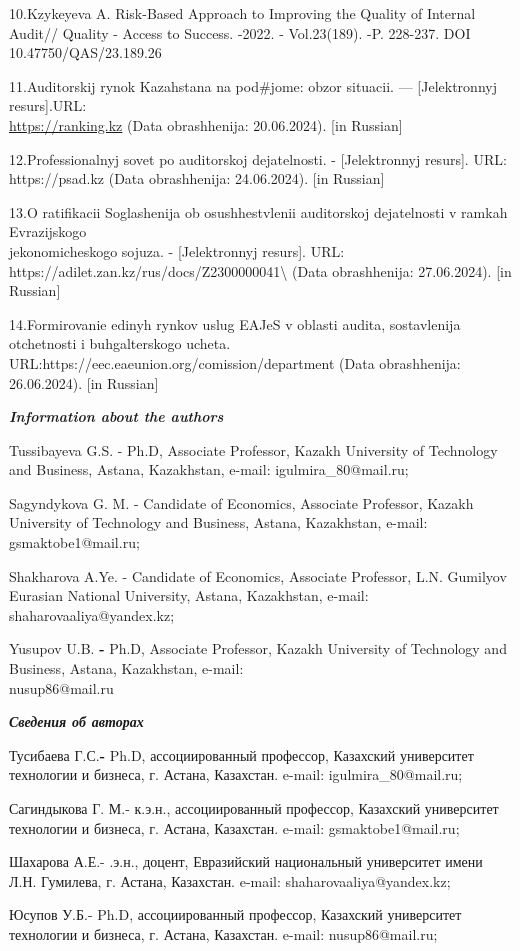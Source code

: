 \begin{references}
10.Kzykeyeva A. Risk-Based Approach to Improving the Quality of Internal
Audit// Quality - Access to Success. -2022. - Vol.23(189). -P. 228-237.
DOI 10.47750/QAS/23.189.26

11.Auditorskij rynok Kazahstana na pod\#jome: obzor situacii. ---
{[}Jelektronnyj resurs{]}.URL:
\\\href{https://ranking.kz/reviews/banking-and-finance/auditorskiy-rynok-kazahstana-na-podyome-obzor-situatsii.html}{https://ranking.kz}
(Data obrashhenija: 20.06.2024). {[}in Russian{]}

12.Professional\textquotesingle nyj sovet po auditorskoj
dejatel\textquotesingle nosti. - {[}Jelektronnyj resurs{]}. URL:
https://psad.kz (Data obrashhenija: 24.06.2024). {[}in Russian{]}

13.O ratifikacii Soglashenija ob osushhestvlenii auditorskoj
dejatel\textquotesingle nosti v ramkah Evrazijskogo \\jekonomicheskogo
sojuza. - {[}Jelektronnyj resurs{]}. URL:
https://adilet.zan.kz/rus/docs/Z2300000041\textbackslash{} (Data
obrashhenija: 27.06.2024). {[}in Russian{]}

14.Formirovanie edinyh rynkov uslug EAJeS v oblasti audita, sostavlenija
otchetnosti i buhgalterskogo ucheta.
URL:https://eec.eaeunion.org/comission/department (Data obrashhenija:
26.06.2024). {[}in Russian{]}
\end{references}

\begin{authorinfo}
\hspace{1em}\emph{\textbf{Information about the authors}}

Tussibayeva G.S. - Ph.D, Associate Professor, Kazakh University of
Technology and Business, Astana, Kazakhstan, e-mail:
igulmira\_80@mail.ru;

Sagyndykova G. M. - Candidate of Economics, Associate Professor, Kazakh
University of Technology and Business, Astana, Kazakhstan, e-mail:
gsmaktobe1@mail.ru;

Shakharova A.Ye. - Candidate of Economics, Associate Professor, L.N.
Gumilyov Eurasian National University, Astana, Kazakhstan, e-mail:
shaharovaaliya@yandex.kz;

Yusupov U.B. \textbf{-} Ph.D, Associate Professor, Kazakh University of
Technology and Business, Astana, Kazakhstan, e-mail: \\nusup86@mail.ru

\hspace{1em}\emph{\textbf{Сведения об авторах}}

Тусибаева Г.С.\textbf{-} Ph.D, ассоциированный профессор, Казахский
университет технологии и бизнеса, г. Астана, Казахстан. e-mail:
igulmira\_80@mail.ru;

Сагиндыкова Г. М.- к.э.н., ассоциированный профессор, Казахский
университет технологии и бизнеса, г. Астана, Казахстан. e-mail:
gsmaktobe1@mail.ru;

Шахарова А.Е.- .э.н., доцент, Евразийский национальный университет имени
Л.Н. Гумилева, г. Астана, Казахстан. e-mail: shaharovaaliya@yandex.kz;

Юсупов У.Б.- Ph.D, ассоциированный профессор, Казахский университет
технологии и бизнеса, г. Астана, Казахстан. e-mail: nusup86@mail.ru;
\end{authorinfo}

